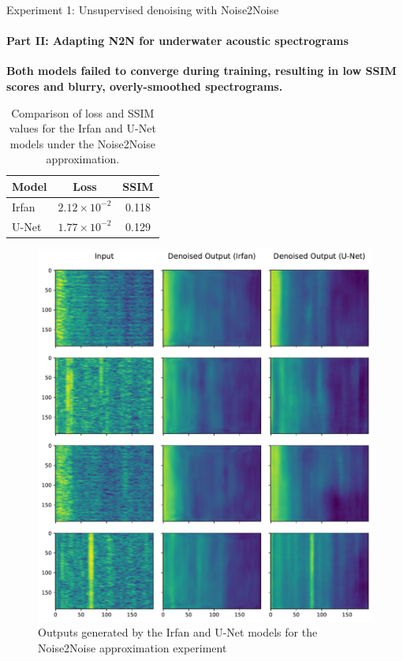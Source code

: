\documentclass[]{beamer}
\begin{document}
\begin{frame}{Experiment 1: Unsupervised denoising with Noise2Noise}
    \framesubtitle{Part II: Adapting N2N for underwater acoustic spectrograms}

    \textbf{Both models failed to converge during training, resulting in low SSIM scores and blurry, overly-smoothed spectrograms.}
    
    \vspace{1em}

    \begin{table}[htbp] 
        \centering 
        \scriptsize
        \captionsetup{font=scriptsize}
        \caption{Comparison of loss and SSIM values for the Irfan and U-Net models under the Noise2Noise approximation.} 
        \begin{tabular}{lcc} 
        \toprule 
        \textbf{Model} & \textbf{Loss} & \textbf{SSIM}\\ \midrule 
        Irfan & $2.12 \times 10^{-2}$ & 0.118 \\
        U-Net & $1.77 \times 10^{-2}$ & 0.129 \\
        \bottomrule
        \end{tabular}
    \end{table}
\end{frame}

\begin{frame}[plain]{}
    \begin{figure}
        \scriptsize
        \captionsetup{font=scriptsize}
        \centering
        \includegraphics[height=0.85\paperheight]{img/in_neq_out_results.pdf}
        \caption{Outputs generated by the Irfan and U-Net models for the Noise2Noise approximation experiment}
    \end{figure}
\end{frame}
\end{document}

